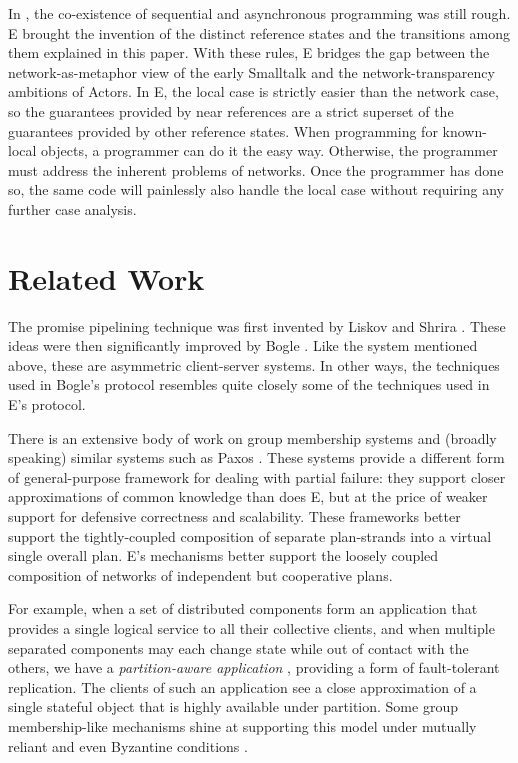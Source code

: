 \documentclass{llncs}
\begin{document}
 In , the co-existence
of sequential and asynchronous programming was still rough. E brought
the invention of the distinct reference states and the transitions
among them explained in this paper. With these rules, E bridges the
gap between the network-as-metaphor view of the early Smalltalk and
the network-transparency ambitions of Actors. In E, the local case is
strictly easier than the network case, so the guarantees provided by
near references are a strict superset of the guarantees provided by
other reference states. When programming for known-local objects, a
programmer can do it the easy way. Otherwise, the programmer must
address the inherent problems of networks.  Once the programmer has
done so, the same code will painlessly also handle the local case
without requiring any further case analysis.

\section{Related Work}

 The promise
pipelining technique was first invented by Liskov and Shrira
\cite{liskov:promises}. These ideas were then significantly improved
by Bogle \cite{bogle:batched}. Like the  system
mentioned above, these are asymmetric client-server systems. In other
ways, the techniques used in Bogle's protocol resembles quite closely
some of the techniques used in E's protocol.

 There is an extensive body of work on
group membership systems \cite{birman:vsync,amir:thesis} and (broadly
speaking) similar systems such as Paxos \cite{lamport:paxos}. These
systems provide a different form of general-purpose framework for
dealing with partial failure: they support closer approximations of
common knowledge than does E, but at the price of weaker support for
defensive correctness and scalability. These frameworks better support
the tightly-coupled composition of separate plan-strands into a
virtual single overall plan. E's mechanisms better support the loosely
coupled composition of networks of independent but cooperative plans.

For example, when a set of distributed components form an application
that provides a single logical service to all their collective
clients, and when multiple separated components may each change state
while out of contact with the others, we have a \emph{partition-aware
application} \cite{partition-aware,bancomat}, providing a form of
fault-tolerant replication. The clients of such an application see a
close approximation of a single stateful object that is highly
available under partition. Some group membership-like mechanisms shine
at supporting this model under mutually reliant and even Byzantine
conditions \cite{castro:bft}.
\end{document}
